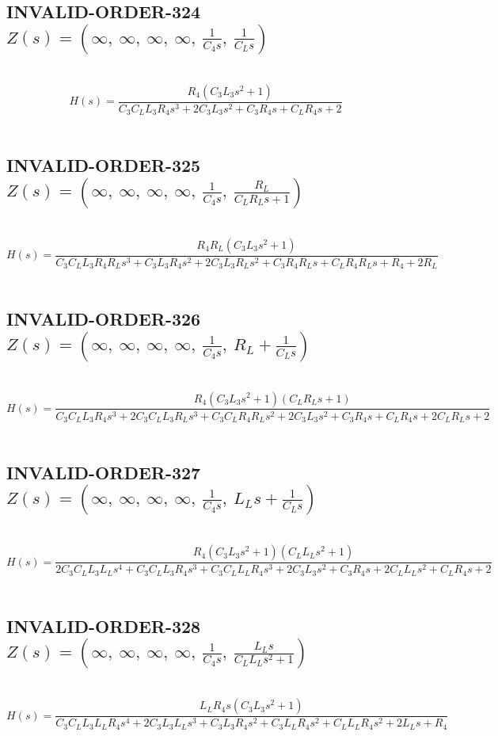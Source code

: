 \documentclass{article}
\begin{document}
\subsection{INVALID-ORDER-324 $Z(s) = \left( \infty, \  \infty, \  \infty, \  \infty, \  \frac{1}{C_{4} s}, \  \frac{1}{C_{L} s}\right)$ } \ 
\textbf{\[H(s) = \frac{R_{4} \left(C_{3} L_{3} s^{2} + 1\right)}{C_{3} C_{L} L_{3} R_{4} s^{3} + 2 C_{3} L_{3} s^{2} + C_{3} R_{4} s + C_{L} R_{4} s + 2}\] } \ 
\subsection{INVALID-ORDER-325 $Z(s) = \left( \infty, \  \infty, \  \infty, \  \infty, \  \frac{1}{C_{4} s}, \  \frac{R_{L}}{C_{L} R_{L} s + 1}\right)$ } \ 
\textbf{\[H(s) = \frac{R_{4} R_{L} \left(C_{3} L_{3} s^{2} + 1\right)}{C_{3} C_{L} L_{3} R_{4} R_{L} s^{3} + C_{3} L_{3} R_{4} s^{2} + 2 C_{3} L_{3} R_{L} s^{2} + C_{3} R_{4} R_{L} s + C_{L} R_{4} R_{L} s + R_{4} + 2 R_{L}}\] } \ 
\subsection{INVALID-ORDER-326 $Z(s) = \left( \infty, \  \infty, \  \infty, \  \infty, \  \frac{1}{C_{4} s}, \  R_{L} + \frac{1}{C_{L} s}\right)$ } \ 
\textbf{\[H(s) = \frac{R_{4} \left(C_{3} L_{3} s^{2} + 1\right) \left(C_{L} R_{L} s + 1\right)}{C_{3} C_{L} L_{3} R_{4} s^{3} + 2 C_{3} C_{L} L_{3} R_{L} s^{3} + C_{3} C_{L} R_{4} R_{L} s^{2} + 2 C_{3} L_{3} s^{2} + C_{3} R_{4} s + C_{L} R_{4} s + 2 C_{L} R_{L} s + 2}\] } \ 
\subsection{INVALID-ORDER-327 $Z(s) = \left( \infty, \  \infty, \  \infty, \  \infty, \  \frac{1}{C_{4} s}, \  L_{L} s + \frac{1}{C_{L} s}\right)$ } \ 
\textbf{\[H(s) = \frac{R_{4} \left(C_{3} L_{3} s^{2} + 1\right) \left(C_{L} L_{L} s^{2} + 1\right)}{2 C_{3} C_{L} L_{3} L_{L} s^{4} + C_{3} C_{L} L_{3} R_{4} s^{3} + C_{3} C_{L} L_{L} R_{4} s^{3} + 2 C_{3} L_{3} s^{2} + C_{3} R_{4} s + 2 C_{L} L_{L} s^{2} + C_{L} R_{4} s + 2}\] } \ 
\subsection{INVALID-ORDER-328 $Z(s) = \left( \infty, \  \infty, \  \infty, \  \infty, \  \frac{1}{C_{4} s}, \  \frac{L_{L} s}{C_{L} L_{L} s^{2} + 1}\right)$ } \ 
\textbf{\[H(s) = \frac{L_{L} R_{4} s \left(C_{3} L_{3} s^{2} + 1\right)}{C_{3} C_{L} L_{3} L_{L} R_{4} s^{4} + 2 C_{3} L_{3} L_{L} s^{3} + C_{3} L_{3} R_{4} s^{2} + C_{3} L_{L} R_{4} s^{2} + C_{L} L_{L} R_{4} s^{2} + 2 L_{L} s + R_{4}}\] } \ 
\end{document}
